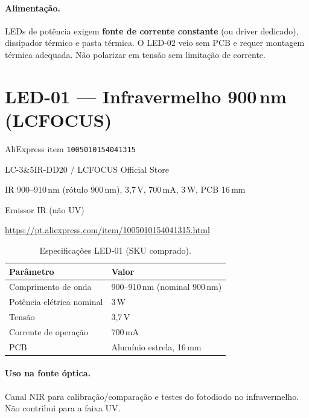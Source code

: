 \documentclass[11pt,a4paper]{article}
\begin{document}
\paragraph{Alimentação.}
LEDs de potência exigem \textbf{fonte de corrente constante} (ou driver
dedicado), dissipador térmico e pasta térmica. O LED-02 veio sem PCB e
requer montagem térmica adequada. Não polarizar em tensão sem limitação
de corrente.

\section{LED-01 --- Infravermelho 900\,nm (LCFOCUS)}

\begin{description}[style=nextline,leftmargin=2.2cm,font=\normalfont\bfseries]
  \item[Identificação] AliExpress item \texttt{1005010154041315}
  \item[Modelo / loja] LC-3\&5IR-DD20 / LCFOCUS Official Store
  \item[SKU adquirido] IR 900--910\,nm (rótulo 900\,nm), 3{,}7\,V, 700\,mA, 3\,W, PCB 16\,mm
  \item[Função] Emissor IR (não UV)
  \item[Link] \url{https://pt.aliexpress.com/item/1005010154041315.html}
\end{description}

\begin{table}[ht]
\centering
\caption{Especificações LED-01 (SKU comprado).}
\begin{tabular}{@{}ll@{}}
\toprule
Parâmetro & Valor \\
\midrule
Comprimento de onda & 900--910\,nm (nominal 900\,nm) \\
Potência elétrica nominal & 3\,W \\
Tensão & 3{,}7\,V \\
Corrente de operação & 700\,mA \\
PCB & Alumínio estrela, 16\,mm \\
\bottomrule
\end{tabular}
\end{table}

\paragraph{Uso na fonte óptica.}
Canal NIR para calibração/comparação e testes do fotodiodo no infravermelho.
Não contribui para a faixa UV.
\end{document}
